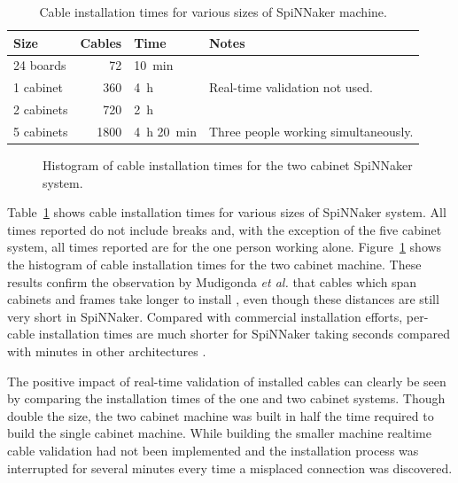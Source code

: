 			\begin{table}
				\center
				\begin{tabular}{lrll}
					\toprule
						Size & Cables & Time & Notes \\
					\midrule
						24 boards  & \num{72}   & \SI{10}{\minute} & \\
						1 cabinet  & \num{360}  & \SI{4}{\hour} &
							Real-time validation not used. \\
						2 cabinets & \num{720}  & \SI{2}{\hour} & \\
						5 cabinets & \num{1800} & \SI{4}{\hour} \SI{20}{\minute} &
							Three people working simultaneously. \\
					\bottomrule
				\end{tabular}
				
				\caption{Cable installation times for various sizes of SpiNNaker
				machine.}
				\label{tab:install-time}
			\end{table}
			
			\begin{figure}
				
				\caption{Histogram of cable installation times for the two cabinet
				SpiNNaker system.}
				\label{fig:install-histogram}
			\end{figure}
			
			Table~\ref{tab:install-time} shows cable installation times for various
			sizes of SpiNNaker system. All times reported do not include breaks and,
			with the exception of the five cabinet system, all times reported are for
			the one person working alone.  Figure~\ref{fig:install-histogram} shows
			the histogram of cable installation times for the two cabinet machine.
			These results confirm the observation by Mudigonda \emph{et al.} that
			cables which span cabinets and frames take longer to install
			\cite{mudigonda11}, even though these distances are still very short in
			SpiNNaker. Compared with commercial installation efforts, per-cable
			installation times are much shorter for SpiNNaker taking seconds compared
			with minutes in other architectures \cite{mudigonda11}.
			
			The positive impact of real-time validation of installed cables can
			clearly be seen by comparing the installation times of the one and two
			cabinet systems. Though double the size, the two cabinet machine was
			built in half the time required to build the single cabinet machine.
			While building the smaller machine realtime cable validation had not been
			implemented and the installation process was interrupted for several
			minutes every time a misplaced connection was discovered.
			

